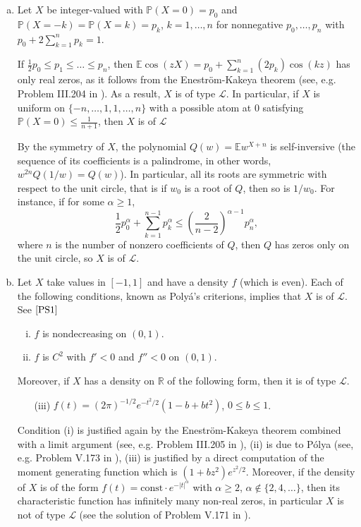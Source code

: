 \documentclass[10pt]{article}
\newcommand{\E}{\mathbb{E}}
\newcommand{\1}{\textbf{1}}
\newcommand{\R}{\mathbb{R}}
\newcommand{\sL}{\mathcal{L}}
\newcommand{\p}[1]{\mathbb{P}\left( #1 \right)}
\theoremstyle{remark}
\theoremstyle{definition}
\begin{document}
\begin{enumerate}[(a)]

\item 
Let $X$ be integer-valued with $\p{X = 0} = p_0$ and $\p{X = -k} = \p{X = k} = p_k$, $k = 1, \dots, n$ for nonnegative $p_0, \dots, p_n$ with $p_0 + 2\sum_{k=1}^n p_k = 1$. 

If $\frac{1}{2}p_0 \leq p_1 \leq \dots \leq p_n$, then $\E \cos(zX) = p_0 + \sum_{k=1}^n (2p_k)\cos(kz)$ has only real zeros, as it follows from the Enestr\"om-Kakeya theorem (see, e.g. Problem III.204 in \cite{PS1}). As a result, $X$ is of type $\sL$. In particular, if $X$ is uniform on $\{-n,\dots, 1, 1, \dots, n\}$ with a possible atom at $0$ satisfying $\p{X = 0} \leq \frac{1}{n+1}$, then $X$ is of $\mathcal{L}$

By the symmetry of $X$, the polynomial $Q(w) = \E w^{X+n}$ is self-inversive (the sequence of its coefficients is a palindrome, in other words, $w^{2n}Q(1/w) = Q(w)$). In particular, all its roots are symmetric with respect to the unit circle, that is if $w_0$ is a root of $Q$, then so is $1/w_0$. For instance, if for some $\alpha \geq 1$,
\[
\frac{1}{2}p_0^\alpha + \sum_{k=1}^{n-1} p_k^\alpha \leq \left(\frac{2}{n-2}\right)^{\alpha-1}p_n^\alpha,
\]
where $n$ is the number of nonzero coefficients of $Q$, then $Q$ has zeros only on the unit circle, so $X$ is of $\mathcal{L}$.

\item
Let $X$ take values in $[-1,1]$ and have a density $f$ (which is even). Each of the following conditions, known as Poly\'a's criterions, implies that $X$ is of $\mathcal{L}$. See $\cite{PS1}$
\begin{enumerate}[(i)]
\item $f$ is  nondecreasing on $(0,1)$.

\item $f$ is $C^2$ with $f' < 0$ and $f'' < 0$ on $(0,1)$.
\end{enumerate}

Moreover, if $X$ has a density on $\R$ of the following form, then it is of type $\mathcal{L}$.

\begin{enumerate}

\item[(iii)] $f(t) = (2\pi)^{-1/2}e^{-t^2/2}(1-b+ bt^2)$, $0 \leq b \leq 1$.
\end{enumerate}

Condition (i) is justified again by the Enestr\"om-Kakeya theorem combined with a limit argument (see, e.g. Problem III.205 in \cite{PS1}), (ii) is due to P\'olya (see, e.g. Problem V.173 in \cite{PS}), (iii) is justified by a direct computation of the moment generating function which is $(1+bz^2)e^{z^2/2}$. Moreover, if the density of $X$ is of the form $f(t) = \text{const}\cdot e^{-|t|^{\alpha}}$ with $\alpha \geq 2$, $\alpha \notin \{2,4,\dots\}$, then its characteristic function has infinitely many non-real zeros, in particular $X$ is not of type $\mathcal{L}$ (see the solution of Problem V.171 in \cite{PS}).


\end{enumerate}
\end{document}

